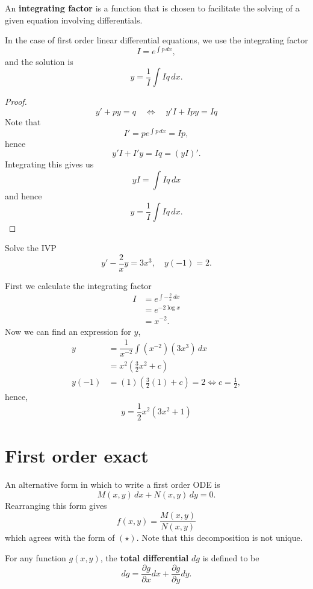 \begin{definition}
    An \textbf{integrating factor} is a function that is chosen to facilitate the solving of a given equation involving differentials.
    \label{def:integrating_factor}
\end{definition}

In the case of first order linear differential equations, we use the integrating factor \[I=e^{\int p\,dx},\] and the solution is \[y=\dfrac1I\int Iq\,dx.\]

\begin{proof}
    \[y'+py=q\quad\iff\quad y'I+Ipy=Iq\]
    Note that \[I'=pe^{\int p\,dx}=Ip,\] hence \[y'I+I'y=Iq=(yI)'.\] Integrating this gives us \[yI=\int Iq\,dx\] and hence \[y=\dfrac1I\int Iq\,dx.\]
\end{proof}

\begin{example}
    Solve the IVP \[y'-\dfrac2xy=3x^3,\quad y(-1)=2.\]
    
    First we calculate the integrating factor
    \begin{align*}
        I&=e^{\int -\frac2x\,dx}\\
        &=e^{-2\log{x}}\\
        &=x^{-2}.
    \end{align*}
    Now we can find an expression for $y$,
    \begin{align*}
        y&=\dfrac1{x^{-2}}\int (x^{-2})(3x^3)\,dx\\
        &=x^2(\frac32x^2+c)\\
        y(-1)&=(1)\left(\frac32(1)+c\right)=2\iff c=\frac12,
    \end{align*}
    hence,
    \[y=\frac12x^2(3x^2+1)\]
\end{example}

\section{First order exact}

An alternative form in which to write a first order ODE is \[M(x,y)\,dx+N(x,y)\,dy=0.\tag{$\star\star$}\] Rearranging this form gives \[f(x,y)=\dfrac{M(x,y)}{N(x,y)}\] which agrees with the form of $(\star)$. Note that this decomposition is not unique.

\begin{definition}
    For any function $g(x,y)$, the \textbf{total differential} $dg$ is defined to be \[dg=\dfrac{\partial g}{\partial x}dx+\dfrac{\partial g}{\partial y}dy.\]
\end{definition}

